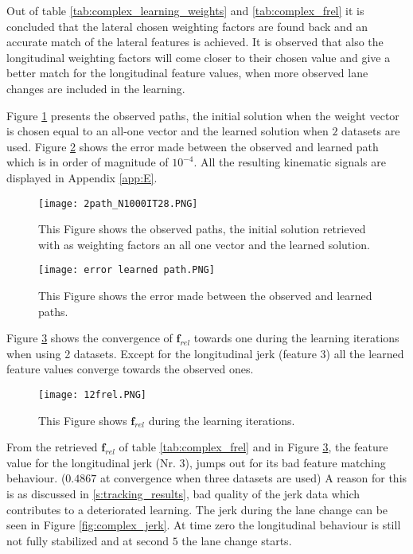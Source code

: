 Out of table \ref{tab:complex_learning_weights} and \ref{tab:complex_frel} it is concluded that the lateral chosen weighting factors are found back and an accurate match of the lateral features is achieved. It is observed that also the longitudinal weighting factors will come closer to their chosen value and give a better match for the longitudinal feature values, when more observed lane changes are included in the learning.

Figure \ref{fig:complex_path} presents the observed paths, the initial solution when the weight vector is chosen equal to an all-one vector and the learned solution when $2$ datasets are used. Figure \ref{fig:complex_path_error} shows the error made between the observed and learned path which is in order of magnitude of $10^{-4}$. All the resulting kinematic signals are displayed in Appendix \ref{app:E}.

\begin{figure}[h!]
	\centering
	\texttt{[image: 2path\_N1000IT28.PNG]}
	\caption{This Figure shows the observed paths, the initial solution retrieved with as weighting factors an all one vector and the learned solution.}	
	\label{fig:complex_path}
\end{figure}

\begin{figure}[h!]
	\centering
	\texttt{[image: error learned path.PNG]}
	\caption{This Figure shows the error made between the observed and learned paths.}	
	\label{fig:complex_path_error}
\end{figure}

Figure \ref{fig:complex_convergence} shows the convergence of $\bm{f}_{rel}$ towards one during the learning iterations when using 2 datasets. Except for the longitudinal jerk (feature $3$) all the learned feature values converge towards the observed ones.

\begin{figure}[h!]
	\centering
	\texttt{[image: 12frel.PNG]}
	\caption{This Figure shows $\bm{f}_{rel}$ during the learning iterations.}	
	\label{fig:complex_convergence}
\end{figure}

From the retrieved $\bm{f}_{rel}$ of table \ref{tab:complex_frel} and in Figure \ref{fig:complex_convergence}, the feature value for the longitudinal jerk (Nr. $3$), jumps out for its bad feature matching behaviour. ($0.4867$ at convergence when three datasets are used) A reason for this is as discussed in \ref{s:tracking_results}, bad quality of the jerk data which contributes to a deteriorated learning. The jerk during the lane change can be seen in Figure \ref{fig:complex_jerk}. At time zero the longitudinal behaviour is still not fully stabilized and at second $5$ the lane change starts.

